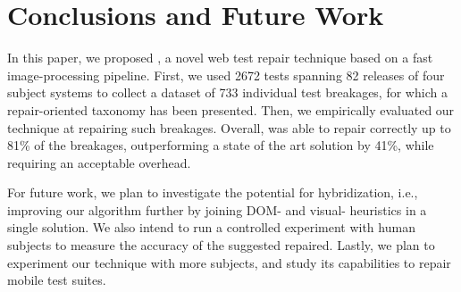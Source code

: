 \section{Conclusions and Future Work}\label{sec:conclusions}

In this paper, we proposed \tool, a novel web test repair technique based on a fast image-processing pipeline.
First, we used 2672 tests spanning 82 releases of four subject systems to collect a dataset of 733 individual test breakages, for which a repair-oriented taxonomy has been presented. 
Then, we empirically evaluated our technique at repairing such breakages. Overall, \tool was able to repair correctly up to 81\% of the breakages, outperforming a state of the art solution by 41\%, while requiring an acceptable overhead.

For future work, we plan to investigate the potential for hybridization, i.e., improving our algorithm further by joining DOM- and visual- heuristics in a single solution. 
We also intend to run a controlled experiment with human subjects to measure the accuracy of the suggested repaired. Lastly, we plan to experiment our technique with more subjects, and study its capabilities to repair mobile test suites. 

